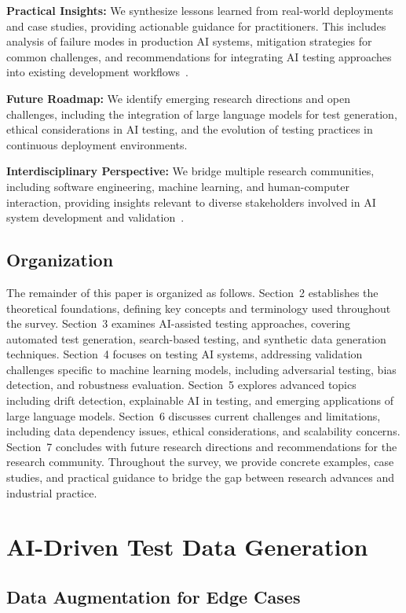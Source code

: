 \documentclass[manuscript,screen,review]{acmart}
\begin{document}
\textbf{Practical Insights:} We synthesize lessons learned from real-world deployments and case studies, providing actionable guidance for practitioners. This includes analysis of failure modes in production AI systems, mitigation strategies for common challenges, and recommendations for integrating AI testing approaches into existing development workflows~\cite{defects4j, selfapr_paper}.

\textbf{Future Roadmap:} We identify emerging research directions and open challenges, including the integration of large language models for test generation, ethical considerations in AI testing, and the evolution of testing practices in continuous deployment environments.

\textbf{Interdisciplinary Perspective:} We bridge multiple research communities, including software engineering, machine learning, and human-computer interaction, providing insights relevant to diverse stakeholders involved in AI system development and validation~\cite{Li2024}.

\subsection{Organization}

The remainder of this paper is organized as follows. Section~2 establishes the theoretical foundations, defining key concepts and terminology used throughout the survey. Section~3 examines AI-assisted testing approaches, covering automated test generation, search-based testing, and synthetic data generation techniques. Section~4 focuses on testing AI systems, addressing validation challenges specific to machine learning models, including adversarial testing, bias detection, and robustness evaluation. Section~5 explores advanced topics including drift detection, explainable AI in testing, and emerging applications of large language models. Section~6 discusses current challenges and limitations, including data dependency issues, ethical considerations, and scalability concerns. Section~7 concludes with future research directions and recommendations for the research community. Throughout the survey, we provide concrete examples, case studies, and practical guidance to bridge the gap between research advances and industrial practice.
\section{AI-Driven Test Data Generation}

\subsection{Data Augmentation for Edge Cases}
\end{document}
